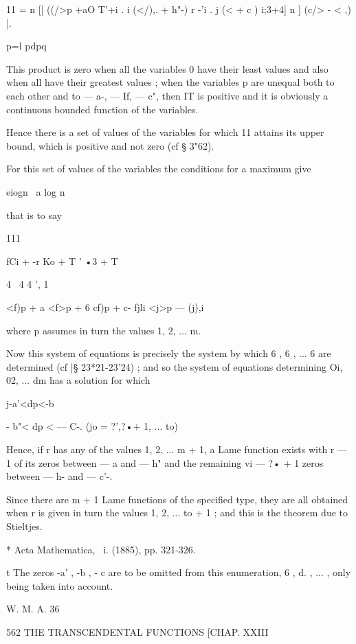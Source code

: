 {{{{{{{11 = n [| ((/>p +aO T'+i . i (</),. + h"-) r -'i . j (<  + c ) i;3+4] n ] (c/>  - < ,) |. 

p=l pdpq 

This product is zero when all the variables 0  have their least values and 
also when all have their greatest values ; when the variables  p are unequal 
both to each other and to — a-, — If, — c", then IT is positive and it is obviously 
a continuous bounded function of the variables. 

Hence there is a set of values of the variables for which 11 attains its 
upper bound, which is positive and not zero (cf § 3"62). 

For this set of values of the variables the conditions for a maximum give 

eiogn \  a log n \  



that is to say 



111 

fCi + -r Ko + T ' •3 + T 

4 \   4    4  ', 1 \  

<f)p + a  <f>p + 6  cf)p + c- fjli <j>p — (j),i 



where p assumes in turn the values 1, 2, ... m. 

Now this system of equations is precisely the system by which 6 , 6 , ... 6  
are determined (cf |§ 23*21-23'24) ; and so the system of equations determining 
Oi, 02, ... dm has a solution for which 

j-a'<dp<-b%

 -  b"< dp < — C-. (jo = ?',?•+ 1, ... to) 

Hence, if r has any of the values 1, 2, ... m + 1, a Lame function exists 
with r — 1 of its zeros between — a  and — h" and the remaining vi — ?• + 1 
zeros between — h- and — c'-. 

Since there are m + 1 Lame functions of the specified type, they are all 
obtained when r is given in turn the values 1, 2, ... to + 1 ; and this is the 
theorem due to Stieltjes. 

* Acta Mathematica, \ i. (1885), pp. 321-326. 

t The zeros -a' , -b , - c  are to be omitted from this enumeration, 6 , d. , ...  ,  only being 
taken into account. 

W. M. A. 36 



562 THE TRANSCENDENTAL FUNCTIONS [CHAP. XXIII 

}}}}}}}
